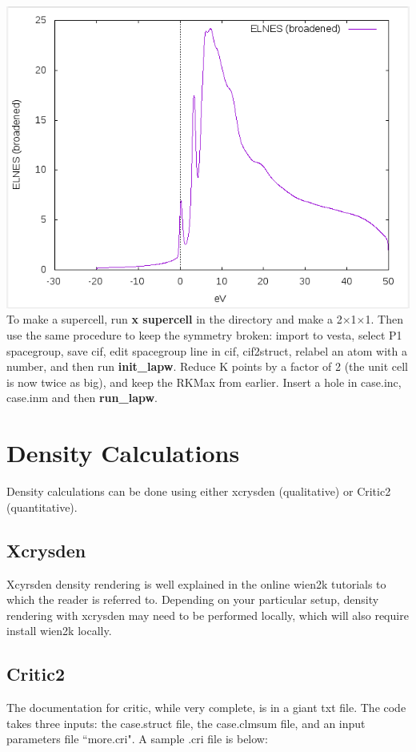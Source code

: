 \documentclass[12pt]{article}
\begin{document}
\includegraphics[scale=0.4]{./images/single_cell_hole_elnes.png}\\

To make a supercell, run \textbf{x supercell} in the directory and make a 2$\times$1$\times$1.  Then use the same procedure to keep the symmetry broken: import to vesta, select P1 spacegroup, save cif, edit spacegroup line in cif, cif2struct, relabel an atom with a number, and then run \textbf{init\_lapw}.  Reduce K points by a factor of 2 (the unit cell is now twice as big), and keep the RKMax from earlier.  Insert a hole in case.inc, case.inm and then \textbf{run\_lapw}.  



\section{Density Calculations}
Density calculations can be done using either xcrysden (qualitative) or Critic2 (quantitative).


\subsection{Xcrysden}
Xcyrsden density rendering is well explained in the online wien2k tutorials to which the reader is referred to.  Depending on your particular setup, density rendering with xcrysden may need to be performed locally, which will also require install wien2k locally. 

\subsection{Critic2}
The documentation for critic, while very complete, is in a giant txt file. The code takes three inputs: the case.struct file, the case.clmsum file, and an input parameters file ``more.cri".  A sample .cri file is below: 
\end{document}
